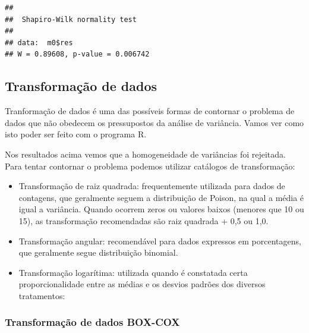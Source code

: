 \documentclass[
]{book}
\newenvironment{Shaded}{\begin{snugshade}}{\end{snugshade}}
\newcommand{\KeywordTok}[1]{\textcolor[rgb]{0.13,0.29,0.53}{\textbf{#1}}}
\newcommand{\NormalTok}[1]{#1}
\newcommand{\OperatorTok}[1]{\textcolor[rgb]{0.81,0.36,0.00}{\textbf{#1}}}
\newcommand{\StringTok}[1]{\textcolor[rgb]{0.31,0.60,0.02}{#1}}
\begin{document}
\begin{verbatim}
## 
##  Shapiro-Wilk normality test
## 
## data:  m0$res
## W = 0.89608, p-value = 0.006742
\end{verbatim}

\hypertarget{transformauxe7uxe3o-de-dados}{%
\subsection{Transformação de dados}\label{transformauxe7uxe3o-de-dados}}

Tranformação de dados é uma das possíveis formas de contornar o problema de dados que não obedecem os pressupostos da análise de variância. Vamos ver como isto poder ser feito com o programa R.

Nos resultados acima vemos que a homogeneidade de variâncias foi rejeitada. Para tentar contornar o problema podemos utilizar catálogos de transformação:

\begin{itemize}
\item
  Transformação de raiz quadrada: frequentemente utilizada para dados de contagens, que geralmente seguem a distribuição de Poison, na qual a média é igual a variância. Quando ocorrem zeros ou valores baixos (menores que 10 ou 15), as transformação recomendadas são raiz quadrada + 0,5 ou 1,0.
\item
  Transformação angular: recomendável para dados expressos em porcentagens, que geralmente segue distribuição binomial.
\item
  Transformação logarítima: utilizada quando é constatada certa proporcionalidade entre as médias e os desvios padrões dos diversos tratamentos:
\end{itemize}

\begin{Shaded}
\end{Shaded}

\hypertarget{transformauxe7uxe3o-de-dados-box-cox}{%
\subsubsection{Transformação de dados BOX-COX}\label{transformauxe7uxe3o-de-dados-box-cox}}
\end{document}
